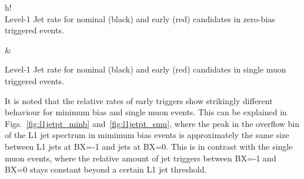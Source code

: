 \documentclass[11pt]{cmspaperpdf}
\begin{document}
\begin{2figures}{h!}
 \\
\caption{Level-1 Jet rate for nominal (black) and early (red) candidates in zero-bias triggered  events.}\label{fig:hbherate_minb} &
\caption{Level-1 Jet rate for nominal (black) and early (red) candidates in single muon triggered events.}\label{fig:hbherate_smu}
\end{2figures}

It is noted that the relative rates of early triggers show strikingly different behaviour for minimum bias and single muon events. This can be explained in Figs.~\ref{fig:l1jetpt_minb} and~\ref{fig:l1jetpt_smu}, where the peak in the overflow bin of the L1 jet spectrum in mimimum bias events is approximately the same size between L1 jets at BX=-1 and jets at BX=0. This is in contrast with the single muon events, where the relative amount of jet triggers between BX=-1 and BX=0 stays constant beyond a certain L1 jet threshold.
\end{document}

